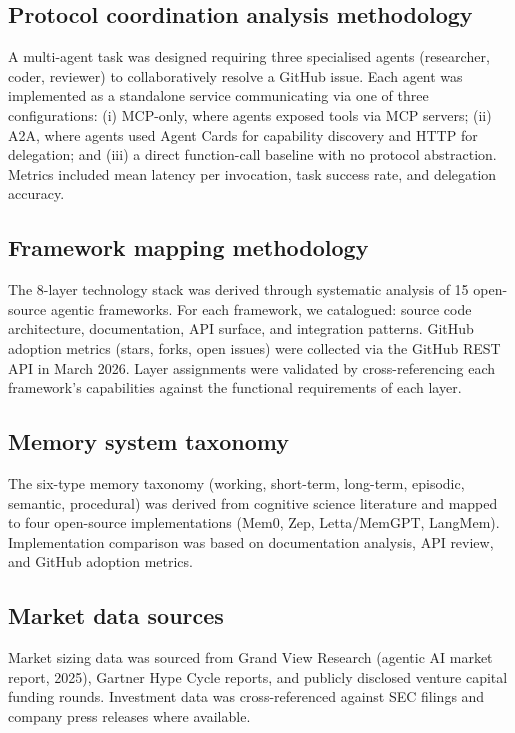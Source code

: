 \documentclass[10pt]{article}
\begin{document}
\subsection*{Protocol coordination analysis methodology}
A multi-agent task was designed requiring three specialised agents (researcher, coder, reviewer) to collaboratively resolve a GitHub issue. Each agent was implemented as a standalone service communicating via one of three configurations: (i) MCP-only\cite{anthropic2024mcp}, where agents exposed tools via MCP servers; (ii) A2A\cite{google2024a2a}, where agents used Agent Cards for capability discovery and HTTP for delegation; and (iii) a direct function-call baseline with no protocol abstraction. Metrics included mean latency per invocation, task success rate, and delegation accuracy.

\subsection*{Framework mapping methodology}
The 8-layer technology stack was derived through systematic analysis of 15 open-source agentic frameworks. For each framework, we catalogued: source code architecture, documentation, API surface, and integration patterns. GitHub adoption metrics (stars, forks, open issues) were collected via the GitHub REST API in March 2026. Layer assignments were validated by cross-referencing each framework's capabilities against the functional requirements of each layer.

\subsection*{Memory system taxonomy}
The six-type memory taxonomy (working, short-term, long-term, episodic, semantic, procedural) was derived from cognitive science literature and mapped to four open-source implementations (Mem0, Zep, Letta/MemGPT, LangMem). Implementation comparison was based on documentation analysis, API review, and GitHub adoption metrics.

\subsection*{Market data sources}
Market sizing data was sourced from Grand View Research\cite{grandview2025agentic} (agentic AI market report, 2025), Gartner Hype Cycle reports, and publicly disclosed venture capital funding rounds. Investment data was cross-referenced against SEC filings and company press releases where available.
\end{document}
